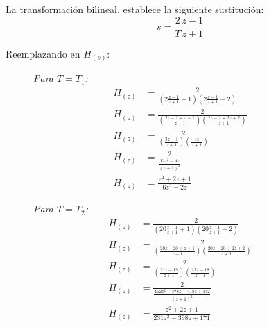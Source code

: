 \documentclass[a4paper,12pt]{report}
\begin{document}
\begin{enumerate}[label=\alph*), left=0pt]
                La transformación bilineal, establece la siguiente sustitución:
                \begin{equation}
                    \label{bilineal}
                    s = \frac{2}{T} \frac{z - 1}{z + 1}
                \end{equation}

                Reemplazando en $H_{(s)}$:
                \begin{figure}[!h]
                    \centering
                    \begin{minipage}{0.4\textwidth}
                        \centering
                        \textit{Para $T = T_1$:}
                        \begin{align*}
                            H_{(z)} &= \frac{2}{\left(2\frac{z - 1}{z + 1} + 1\right)\left(2\frac{z - 1}{z + 1} + 2\right)}\\
                            H_{(z)} &= \frac{2}{\left(\frac{2z - 2 + z + 1}{z + 1}\right)\left(\frac{2z - 2 + 2z + 2}{z + 1}\right)}\\
                            H_{(z)} &= \frac{2}{\left(\frac{3z - 1}{z + 1}\right)\left(\frac{4z}{z + 1}\right)}\\
                            H_{(z)} &= \frac{2}{\frac{12z^2 - 4z}{(z + 1)^2}}\\
                            H_{(z)} &= \frac{z^2 + 2z + 1}{6z^2 - 2z}
                        \end{align*}
                    \end{minipage}
                    \hspace{0.5cm}
                    \centering
                    \begin{minipage}{0.4\textwidth}
                        \centering
                        \textit{Para $T = T_2$:}
                        \begin{align*}
                            H_{(z)} &= \frac{2}{\left(20\frac{z - 1}{z + 1} + 1\right)\left(20\frac{z - 1}{z + 1} + 2\right)}\\
                            H_{(z)} &= \frac{2}{\left(\frac{20z - 20 + z + 1}{z + 1}\right)\left(\frac{20z - 20 + 2z + 2}{z + 1}\right)}\\
                            H_{(z)} &= \frac{2}{\left(\frac{21z - 19}{z + 1}\right)\left(\frac{22z - 18}{z + 1}\right)}\\
                            H_{(z)} &= \frac{2}{\frac{462z^2 - 378z - 418z + 342}{(z + 1)^2}}\\
                            H_{(z)} &= \frac{z^2 + 2z + 1}{231z^2 - 398z + 171}
                        \end{align*}
                    \end{minipage}
                \end{figure}


\end{enumerate}
\end{document}

